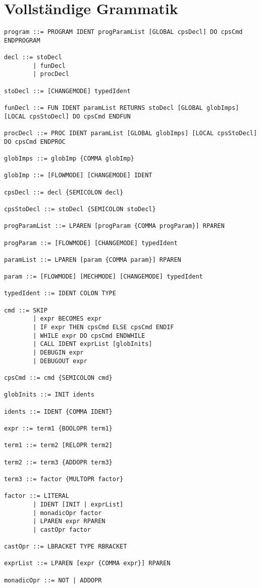 \documentclass[10pt, a4paper, twocolumn]{article} %
\begin{document}
\section{Vollständige Grammatik}
\begin{lstlisting}
program ::= PROGRAM IDENT progParamList [GLOBAL cpsDecl] DO cpsCmd ENDPROGRAM

decl ::= stoDecl
        | funDecl
        | procDecl

stoDecl ::= [CHANGEMODE] typedIdent

funDecl ::= FUN IDENT paramList RETURNS stoDecl [GLOBAL globImps] [LOCAL cpsStoDecl] DO cpsCmd ENDFUN

procDecl ::= PROC IDENT paramList [GLOBAL globImps] [LOCAL cpsStoDecl] DO cpsCmd ENDPROC

globImps ::= globImp {COMMA globImp}

globImp ::= [FLOWMODE] [CHANGEMODE] IDENT

cpsDecl ::= decl {SEMICOLON decl}

cpsStoDecl ::= stoDecl {SEMICOLON stoDecl}

progParamList ::= LPAREN [progParam {COMMA progParam}] RPAREN

progParam ::= [FLOWMODE] [CHANGEMODE] typedIdent

paramList ::= LPAREN [param {COMMA param}] RPAREN

param ::= [FLOWMODE] [MECHMODE] [CHANGEMODE] typedIdent

typedIdent ::= IDENT COLON TYPE

cmd ::= SKIP
        | expr BECOMES expr
        | IF expr THEN cpsCmd ELSE cpsCmd ENDIF
        | WHILE expr DO cpsCmd ENDWHILE
        | CALL IDENT exprList [globInits]
        | DEBUGIN expr
        | DEBUGOUT expr

cpsCmd ::= cmd {SEMICOLON cmd}

globInits ::= INIT idents

idents ::= IDENT {COMMA IDENT}

expr ::= term1 {BOOLOPR term1}

term1 ::= term2 [RELOPR term2]

term2 ::= term3 {ADDOPR term3}

term3 ::= factor {MULTOPR factor}

factor ::= LITERAL
        | IDENT [INIT | exprList]
        | monadicOpr factor
        | LPAREN expr RPAREN
        | castOpr factor

castOpr ::= LBRACKET TYPE RBRACKET

exprList ::= LPAREN [expr {COMMA expr}] RPAREN

monadicOpr ::= NOT | ADDOPR
\end{lstlisting}
\end{document}

